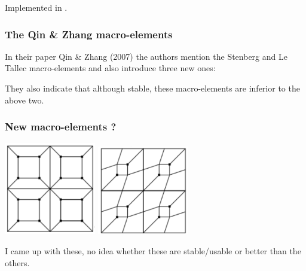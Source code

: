 Implemented in .

\subsubsection{The Qin \& Zhang macro-elements}

In their paper Qin \& Zhang (2007) \cite{qizh07} the authors mention the Stenberg and Le Tallec
macro-elements and also introduce three new ones:




They also indicate that although stable, these macro-elements are inferior 
to the above two. 

\subsubsection{New macro-elements ?}

\begin{center}
\includegraphics[width=4cm]{images/meshtopos/m21}
\includegraphics[width=4cm]{images/meshtopos/m22}
\end{center}

I came up with these, no idea whether these are stable/usable or better than the others.






 

